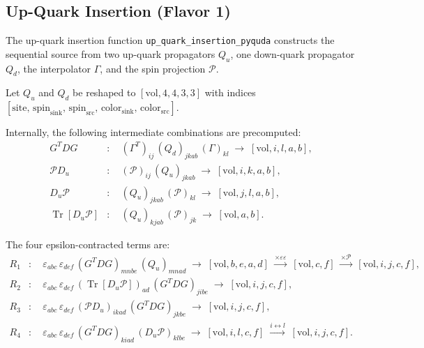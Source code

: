 \documentclass[11pt,a4paper]{article}
\newcommand{\eps}{\varepsilon}
\begin{document}
\subsection{Up-Quark Insertion (Flavor 1)}

The up-quark insertion function \texttt{up\_quark\_insertion\_pyquda} constructs the
sequential source from two up-quark propagators $Q_u$, one down-quark propagator
$Q_d$, the interpolator $\Gamma$, and the spin projection $\mathcal{P}$.

Let $Q_u$ and $Q_d$ be reshaped to $[\mathrm{vol}, 4, 4, 3, 3]$ with indices
$[\text{site},\, \text{spin}_{\text{sink}},\, \text{spin}_{\text{src}},\,
  \text{color}_{\text{sink}},\, \text{color}_{\text{src}}]$.

Internally, the following intermediate combinations are precomputed:
\begin{align}
  G^T D G &: \quad (\Gamma^T)_{ij}\, (Q_d)_{jkab}\, (\Gamma)_{kl}
    \;\to\; [\mathrm{vol}, i, l, a, b], \\
  \mathcal{P} D_u &: \quad (\mathcal{P})_{ij}\, (Q_u)_{jkab}
    \;\to\; [\mathrm{vol}, i, k, a, b], \\
  D_u \mathcal{P} &: \quad (Q_u)_{jkab}\, (\mathcal{P})_{kl}
    \;\to\; [\mathrm{vol}, j, l, a, b], \\
  \operatorname{Tr}[D_u \mathcal{P}] &: \quad
    (Q_u)_{kjab}\, (\mathcal{P})_{jk}
    \;\to\; [\mathrm{vol}, a, b].
\end{align}

The four epsilon-contracted terms are:
\begin{align}
  R_1 &: \quad
    \eps_{abc}\,\eps_{def}\,
    (G^T D G)_{mnbe}\, (Q_u)_{mnad}
    \;\to\; [\mathrm{vol}, b, e, a, d] \;
    \xrightarrow{\times \eps\eps} \; [\mathrm{vol}, c, f] \;
    \xrightarrow{\times \mathcal{P}} \; [\mathrm{vol}, i, j, c, f], \\[4pt]
  R_2 &: \quad
    \eps_{abc}\,\eps_{def}\,
    (\operatorname{Tr}[D_u\mathcal{P}])_{ad}\,
    (G^T D G)_{jibe}
    \;\to\; [\mathrm{vol}, i, j, c, f], \\[4pt]
  R_3 &: \quad
    \eps_{abc}\,\eps_{def}\,
    (\mathcal{P} D_u)_{ikad}\, (G^T D G)_{jkbe}
    \;\to\; [\mathrm{vol}, i, j, c, f], \\[4pt]
  R_4 &: \quad
    \eps_{abc}\,\eps_{def}\,
    (G^T D G)_{kiad}\, (D_u\mathcal{P})_{klbe}
    \;\to\; [\mathrm{vol}, i, l, c, f] \;
    \xrightarrow{i \leftrightarrow l} \; [\mathrm{vol}, i, j, c, f].
\end{align}
\end{document}
